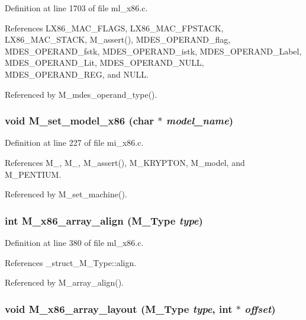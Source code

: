 Definition at line 1703 of file ml\_\-x86.c.

References LX86\_\-MAC\_\-FLAGS, LX86\_\-MAC\_\-FPSTACK, LX86\_\-MAC\_\-STACK, M\_\-assert(), MDES\_\-OPERAND\_\-flag, MDES\_\-OPERAND\_\-fstk, MDES\_\-OPERAND\_\-istk, MDES\_\-OPERAND\_\-Label, MDES\_\-OPERAND\_\-Lit, MDES\_\-OPERAND\_\-NULL, MDES\_\-OPERAND\_\-REG, and NULL.

Referenced by M\_\-mdes\_\-operand\_\-type().
\subsubsection{\setlength{\rightskip}{0pt plus 5cm}void M\_\-set\_\-model\_\-x86 (char $\ast$ {\em model\_\-name})}\label{m__x86_8h_4b9658db28be939288b081434a0fb98a}




Definition at line 227 of file mi\_\-x86.c.

References M\_, M\_, M\_\-assert(), M\_\-KRYPTON, M\_\-model, and M\_\-PENTIUM.

Referenced by M\_\-set\_\-machine().
\subsubsection{\setlength{\rightskip}{0pt plus 5cm}int M\_\-x86\_\-array\_\-align (\bf{M\_\-Type} {\em type})}\label{m__x86_8h_4783d37d75647a65f606c2330917101a}




Definition at line 380 of file ml\_\-x86.c.

References \_\-struct\_\-M\_\-Type::align.

Referenced by M\_\-array\_\-align().
\subsubsection{\setlength{\rightskip}{0pt plus 5cm}void M\_\-x86\_\-array\_\-layout (\bf{M\_\-Type} {\em type}, int $\ast$ {\em offset})}\label{m__x86_8h_52a40ee0827e72a61aaff2223ea5ff4c}




